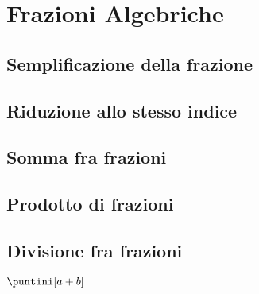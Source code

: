 \chapter{Frazioni Algebriche}
\label{cha:FrazioniAlgebriche}
\minitoc
\mtcskip                                %
\minilof                                %
\mtcskip                                %
\minilot
\section{Semplificazione della frazione }
\section{Riduzione allo stesso indice}
\section{Somma fra frazioni}
\section{Prodotto di frazioni}
\section{Divisione fra frazioni}



$\puntini[a+b]$